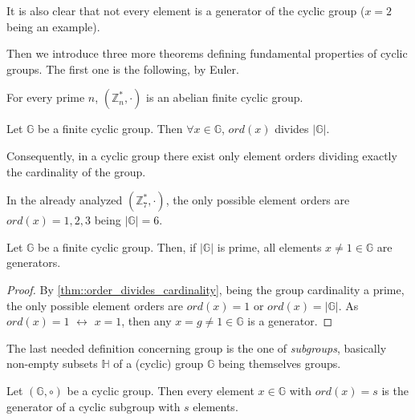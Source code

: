 \begin{myrem}
    It is also clear that not every element is a generator of the cyclic group ($x=2$ being an example).
\end{myrem}
\noindent
Then we introduce three more theorems defining fundamental properties of cyclic groups. The first one is the following, by Euler.
\begin{mytheorem}
    For every prime $n$, $(\mathbb{Z}_n^{*},\cdot)$ is an abelian finite cyclic group.
\end{mytheorem}
\begin{mytheorem}
\label{thm::order_divides_cardinality}
    Let $\mathbb{G}$ be a finite cyclic group. Then $\forall x \in \mathbb{G}$, $ord(x)$ divides $|\mathbb{G}|$.
\end{mytheorem}
\noindent
Consequently, in a cyclic group there exist only element orders dividing exactly the cardinality of the group. 
\begin{myrem}
    In the already analyzed $(\mathbb{Z}_7^{*},\cdot)$, the only possible element orders are $ord(x)=1,2,3$ being $|\mathbb{G}| = 6$.
\end{myrem}
\begin{mytheorem}
\label{thm::prime_order_all_gen}
    Let $\mathbb{G}$ be a finite cyclic group. Then, if $|\mathbb{G}|$ is prime, all elements $x \neq 1 \in \mathbb{G}$ are generators.
\end{mytheorem}
\begin{proof}
    By \ref{thm::order_divides_cardinality}, being the group cardinality a prime, the only possible element orders are $ord(x)=1$ or $ord(x)=|\mathbb{G}|$. As $ord(x)=1$ $\longleftrightarrow$ $x=1$, then any $x=g \neq 1 \in \mathbb{G}$ is a generator.
\end{proof}
\noindent
The last needed definition concerning group is the one of \textit{subgroups}, basically non-empty subsets $\mathbb{H}$ of a (cyclic) group $\mathbb{G}$ being themselves groups.
\begin{mytheorem}
    Let $(\mathbb{G},\circ)$ be a cyclic group. Then every element $x \in \mathbb{G}$ with $ord(x)=s$ is the generator of a cyclic subgroup with $s$ elements.
\end{mytheorem}
